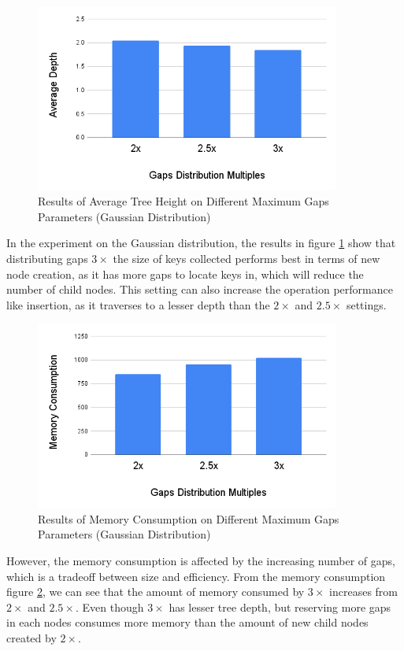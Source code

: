 \begin{figure}[H]
    \centering
    \includegraphics[width=100mm,scale=1]{Figures/AVGGauMaxGaps.png}
    \caption{
     Results of Average Tree Height on Different Maximum Gaps Parameters (Gaussian Distribution)
    }
    \label{fig:AvgMaxGapsGau}
\end{figure}
In the experiment on the Gaussian distribution, the results in figure \ref{fig:AvgMaxGapsGau} show that distributing gaps $3\times$ the size of keys collected performs best in terms of new node creation, as it has more gaps to locate keys in, which will reduce the number of child nodes. This setting can also increase the operation performance like insertion, as it traverses to a lesser depth than the $2\times$ and $2.5\times$ settings.
\begin{figure}[H]
    \centering
    \includegraphics[width=100mm,scale=1]{Figures/MemoryMaxGapsGau.png}
    \caption{
     Results of Memory Consumption on Different Maximum Gaps Parameters (Gaussian Distribution)
    }
    \label{fig:MemoryMaxGapsGau}
\end{figure}
However, the memory consumption is affected by the increasing number of gaps, which is a tradeoff between size and efficiency. From the memory consumption figure \ref{fig:MemoryMaxGapsGau}, we can see that the amount of memory consumed by $3\times$ increases from $2\times$ and $2.5\times$. Even though $3\times$ has lesser tree depth, but reserving more gaps in each nodes consumes more memory than the amount of new child nodes created by $2\times$.


